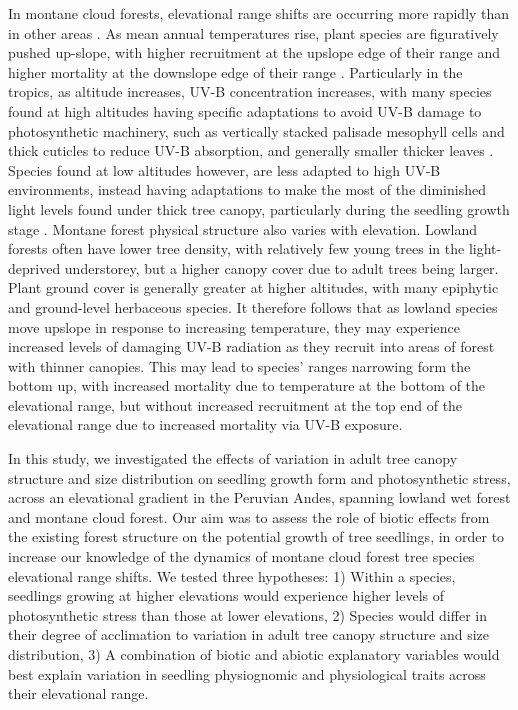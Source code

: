 \documentclass[a4paper, 11pt]{article}
\begin{document}
In montane cloud forests, elevational range shifts are occurring more rapidly than in other areas \citep{}. As mean annual temperatures rise, plant species are figuratively pushed up-slope, with higher recruitment at the upslope edge of their range and higher mortality at the downslope edge of their range \citep{}. Particularly in the tropics, as altitude increases, UV-B concentration increases, with many species found at high altitudes \citep{} having specific adaptations to avoid UV-B damage to photosynthetic machinery, such as vertically stacked palisade mesophyll cells and thick cuticles to reduce UV-B absorption, and generally smaller thicker leaves \citep{}. Species found at low altitudes however, are less adapted to high UV-B environments, instead having adaptations to make the most of the diminished light levels found under thick tree canopy, particularly during the seedling growth stage \citep{}. Montane forest physical structure also varies with elevation. Lowland forests often have lower tree density, with relatively few young trees in the light-deprived understorey, but a higher canopy cover due to adult trees being larger. Plant ground cover is generally greater at higher altitudes, with many epiphytic and ground-level herbaceous species. It therefore follows that as lowland species move upslope in response to increasing temperature, they may experience increased levels of damaging UV-B radiation as they recruit into areas of forest with thinner canopies. This may lead to species' ranges narrowing form the bottom up, with increased mortality due to temperature at the bottom of the elevational range, but without increased recruitment at the top end of the elevational range due to increased mortality via UV-B exposure.

In this study, we investigated the effects of variation in adult tree canopy structure and size distribution on seedling growth form and photosynthetic stress, across an elevational gradient in the Peruvian Andes, spanning lowland wet forest and montane cloud forest. Our aim was to assess the role of biotic effects from the existing forest structure on the potential growth of tree seedlings, in order to increase our knowledge of the dynamics of montane cloud forest tree species elevational range shifts. We tested three hypotheses: 1) Within a species, seedlings growing at higher elevations would experience higher levels of photosynthetic stress than those at lower elevations, 2) Species would differ in their degree of acclimation to variation in adult tree canopy structure and size distribution, 3) A combination of biotic and abiotic explanatory variables would best explain variation in seedling physiognomic and physiological traits across their elevational range.  
\end{document}
